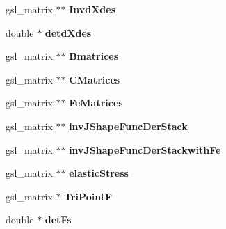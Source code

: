 \begin{DoxyCompactItemize}
\item 
\hypertarget{classShapeBase_a4a5fc631abba61fa2488112a7a674377}{}gsl\+\_\+matrix $\ast$$\ast$ {\bfseries Invd\+Xdes}\label{classShapeBase_a4a5fc631abba61fa2488112a7a674377}

\item 
\hypertarget{classShapeBase_ad1c2ef88314c7e567ca2bdcc6592f5ec}{}double $\ast$ {\bfseries detd\+Xdes}\label{classShapeBase_ad1c2ef88314c7e567ca2bdcc6592f5ec}

\item 
\hypertarget{classShapeBase_ace860a66508f503be2a46c351a9358c3}{}gsl\+\_\+matrix $\ast$$\ast$ {\bfseries Bmatrices}\label{classShapeBase_ace860a66508f503be2a46c351a9358c3}

\item 
\hypertarget{classShapeBase_adbb0a1617e6e0acfbf67038a5aed8366}{}gsl\+\_\+matrix $\ast$$\ast$ {\bfseries C\+Matrices}\label{classShapeBase_adbb0a1617e6e0acfbf67038a5aed8366}

\item 
\hypertarget{classShapeBase_ac3259f3f52ab4d7a514ea987012a6bd6}{}gsl\+\_\+matrix $\ast$$\ast$ {\bfseries Fe\+Matrices}\label{classShapeBase_ac3259f3f52ab4d7a514ea987012a6bd6}

\item 
\hypertarget{classShapeBase_a9478b062928ae554c25cd3269cc9e790}{}gsl\+\_\+matrix $\ast$$\ast$ {\bfseries inv\+J\+Shape\+Func\+Der\+Stack}\label{classShapeBase_a9478b062928ae554c25cd3269cc9e790}

\item 
\hypertarget{classShapeBase_a490391c781e50cfc7e2f1a0814bb6d25}{}gsl\+\_\+matrix $\ast$$\ast$ {\bfseries inv\+J\+Shape\+Func\+Der\+Stackwith\+Fe}\label{classShapeBase_a490391c781e50cfc7e2f1a0814bb6d25}

\item 
\hypertarget{classShapeBase_acd549e0086d16194ae389ae528969596}{}gsl\+\_\+matrix $\ast$$\ast$ {\bfseries elastic\+Stress}\label{classShapeBase_acd549e0086d16194ae389ae528969596}

\item 
\hypertarget{classShapeBase_ab7ac8f14929ab37e8eae5fcaf93b18a8}{}gsl\+\_\+matrix $\ast$ {\bfseries Tri\+Point\+F}\label{classShapeBase_ab7ac8f14929ab37e8eae5fcaf93b18a8}

\item 
\hypertarget{classShapeBase_ab41f6a16647607b1c898eea1c2860367}{}double $\ast$ {\bfseries det\+Fs}\label{classShapeBase_ab41f6a16647607b1c898eea1c2860367}


\end{DoxyCompactItemize}
